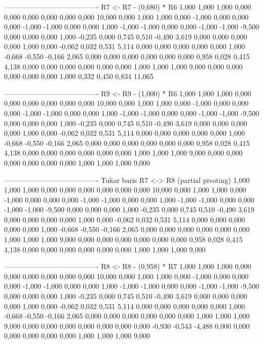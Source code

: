 \documentclass[12pt]{article}
\begin{document}
\begin{enumerate}
\begin{keluaran}
----------------------------------------
R7 <- R7 - (0,680) * R6
1,000   1,000   1,000   0,000   0,000   0,000   0,000   0,000   0,000   10,000
0,000   1,000   1,000   0,000   -1,000  0,000   0,000   0,000   -1,000  -1,000
0,000   0,000   1,000   -1,000  -1,000  0,000   0,000   -1,000  -1,000  -9,500
0,000   0,000   0,000   1,000   -0,235  0,000   0,745   0,510   -0,490  3,619
0,000   0,000   0,000   0,000   1,000   0,000   -0,062  0,032   0,531   5,114
0,000   0,000   0,000   0,000   0,000   1,000   -0,668  -0,550  -0,166  2,065
0,000   0,000   0,000   0,000   0,000   0,000   0,958   0,028   0,415   4,138
0,000   0,000   0,000   0,000   0,000   0,000   1,000   1,000   1,000   9,000
0,000   0,000   0,000   0,000   0,000   1,000   0,332   0,450   0,834   11,065

----------------------------------------
R9 <- R9 - (1,000) * R6
1,000   1,000   1,000   0,000   0,000   0,000   0,000   0,000   0,000   10,000
0,000   1,000   1,000   0,000   -1,000  0,000   0,000   0,000   -1,000  -1,000
0,000   0,000   1,000   -1,000  -1,000  0,000   0,000   -1,000  -1,000  -9,500
0,000   0,000   0,000   1,000   -0,235  0,000   0,745   0,510   -0,490  3,619
0,000   0,000   0,000   0,000   1,000   0,000   -0,062  0,032   0,531   5,114
0,000   0,000   0,000   0,000   0,000   1,000   -0,668  -0,550  -0,166  2,065
0,000   0,000   0,000   0,000   0,000   0,000   0,958   0,028   0,415   4,138
0,000   0,000   0,000   0,000   0,000   0,000   1,000   1,000   1,000   9,000
0,000   0,000   0,000   0,000   0,000   0,000   1,000   1,000   1,000   9,000

----------------------------------------
Tukar baris R7 <-> R8 (partial pivoting)
1,000   1,000   1,000   0,000   0,000   0,000   0,000   0,000   0,000   10,000
0,000   1,000   1,000   0,000   -1,000  0,000   0,000   0,000   -1,000  -1,000
0,000   0,000   1,000   -1,000  -1,000  0,000   0,000   -1,000  -1,000  -9,500
0,000   0,000   0,000   1,000   -0,235  0,000   0,745   0,510   -0,490  3,619
0,000   0,000   0,000   0,000   1,000   0,000   -0,062  0,032   0,531   5,114
0,000   0,000   0,000   0,000   0,000   1,000   -0,668  -0,550  -0,166  2,065
0,000   0,000   0,000   0,000   0,000   0,000   1,000   1,000   1,000   9,000
0,000   0,000   0,000   0,000   0,000   0,000   0,958   0,028   0,415   4,138
0,000   0,000   0,000   0,000   0,000   0,000   1,000   1,000   1,000   9,000

----------------------------------------
R8 <- R8 - (0,958) * R7
1,000   1,000   1,000   0,000   0,000   0,000   0,000   0,000   0,000   10,000
0,000   1,000   1,000   0,000   -1,000  0,000   0,000   0,000   -1,000  -1,000
0,000   0,000   1,000   -1,000  -1,000  0,000   0,000   -1,000  -1,000  -9,500
0,000   0,000   0,000   1,000   -0,235  0,000   0,745   0,510   -0,490  3,619
0,000   0,000   0,000   0,000   1,000   0,000   -0,062  0,032   0,531   5,114
0,000   0,000   0,000   0,000   0,000   1,000   -0,668  -0,550  -0,166  2,065
0,000   0,000   0,000   0,000   0,000   0,000   1,000   1,000   1,000   9,000
0,000   0,000   0,000   0,000   0,000   0,000   0,000   -0,930  -0,543  -4,488
0,000   0,000   0,000   0,000   0,000   0,000   1,000   1,000   1,000   9,000


\end{keluaran}
\end{enumerate}
\end{document}
